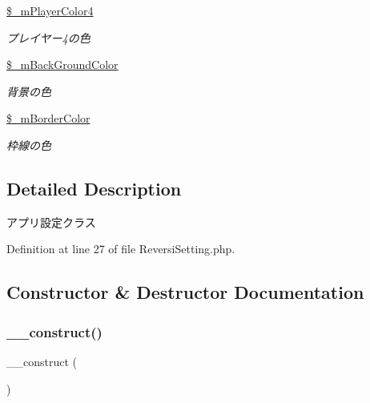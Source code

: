 \begin{DoxyCompactItemize}
\mbox{\label{class_reversi_setting_ae6ff4c57f51c13fc35d5238c119f8e1b}} 
\hyperlink{class_reversi_setting_ae6ff4c57f51c13fc35d5238c119f8e1b}{\$\+\_\+m\+Player\+Color4}
\begin{DoxyCompactList}\small\item\em プレイヤー4の色 \end{DoxyCompactList}\item 
\mbox{\label{class_reversi_setting_a69c86bb449573ccc89975e29066e71d7}} 
\hyperlink{class_reversi_setting_a69c86bb449573ccc89975e29066e71d7}{\$\+\_\+m\+Back\+Ground\+Color}
\begin{DoxyCompactList}\small\item\em 背景の色 \end{DoxyCompactList}\item 
\mbox{\label{class_reversi_setting_a901c34066dafa1810c09bc3037e692f6}} 
\hyperlink{class_reversi_setting_a901c34066dafa1810c09bc3037e692f6}{\$\+\_\+m\+Border\+Color}
\begin{DoxyCompactList}\small\item\em 枠線の色 \end{DoxyCompactList}\end{DoxyCompactItemize}


\subsection{Detailed Description}
アプリ設定クラス 

Definition at line 27 of file Reversi\+Setting.\+php.



\subsection{Constructor \& Destructor Documentation}
\mbox{\label{class_reversi_setting_a095c5d389db211932136b53f25f39685}} 
\subsubsection{\texorpdfstring{\+\_\+\+\_\+construct()}{\_\_construct()}}
{\footnotesize\ttfamily \+\_\+\+\_\+construct (\begin{DoxyParamCaption}{ }\end{DoxyParamCaption})}



